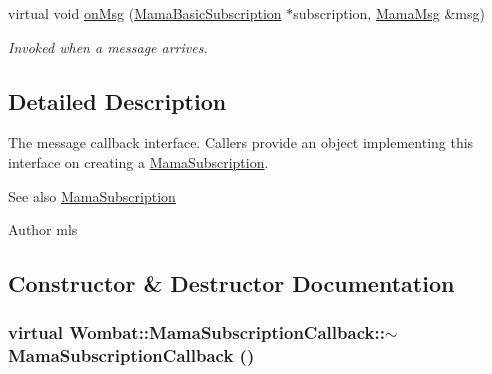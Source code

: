 \begin{DoxyCompactItemize}
\item 
virtual void \hyperlink{classWombat_1_1MamaSubscriptionCallback_a1a8180641b743dabe772f78836722be0}{onMsg} (\hyperlink{classWombat_1_1MamaBasicSubscription}{MamaBasicSubscription} $\ast$subscription, \hyperlink{classWombat_1_1MamaMsg}{MamaMsg} \&msg)
\begin{DoxyCompactList}\small\item\em Invoked when a message arrives. \item\end{DoxyCompactList}\end{DoxyCompactItemize}


\subsection{Detailed Description}
The message callback interface. Callers provide an object implementing this interface on creating a {\ttfamily \hyperlink{classWombat_1_1MamaSubscription}{MamaSubscription}}.

\begin{DoxySeeAlso}{See also}
\hyperlink{classWombat_1_1MamaSubscription}{MamaSubscription} 
\end{DoxySeeAlso}
\begin{DoxyAuthor}{Author}
mls 
\end{DoxyAuthor}


\subsection{Constructor \& Destructor Documentation}
\hypertarget{classWombat_1_1MamaSubscriptionCallback_ace64014ad0b2b7d79395a50de562c94b}{
\subsubsection[{$\sim$MamaSubscriptionCallback}]{\setlength{\rightskip}{0pt plus 5cm}virtual Wombat::MamaSubscriptionCallback::$\sim$MamaSubscriptionCallback ()}}
\label{classWombat_1_1MamaSubscriptionCallback_ace64014ad0b2b7d79395a50de562c94b}


